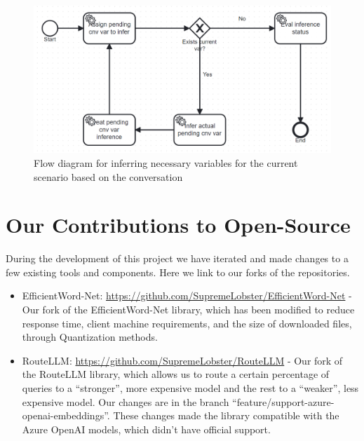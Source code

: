 \documentclass[a4paper,12pt,twoside]{ThesisStyle}
\begin{document}
\begin{figure}[H]
  \centering
  \includegraphics[width=1\textwidth]{imatges/Infere_conversation_variables.bpmn20.png}
  \caption{Flow diagram for inferring necessary variables for the current scenario based on the conversation}
  \label{fig:infervariablesprocess}
\end{figure}

\chapter{Our Contributions to Open-Source}
\label{cap:oss_contributions}

During the development of this project we have iterated and made changes to a few existing tools and components. Here we link to our forks of the repositories.

\begin{itemize}
  \item EfficientWord-Net: \url{https://github.com/SupremeLobster/EfficientWord-Net} - Our fork of the EfficientWord-Net library, which has been modified to reduce response time, client machine requirements, and the size of downloaded files, through Quantization methods.
  \item RouteLLM: \url{https://github.com/SupremeLobster/RouteLLM} - Our fork of the RouteLLM library, which allows us to route a certain percentage of queries to a ``stronger'', more expensive model and the rest to a ``weaker'', less expensive model. Our changes are in the branch ``feature/support-azure-openai-embeddings''. These changes made the library compatible with the Azure OpenAI models, which didn't have official support.
\end{itemize}
\end{document}
